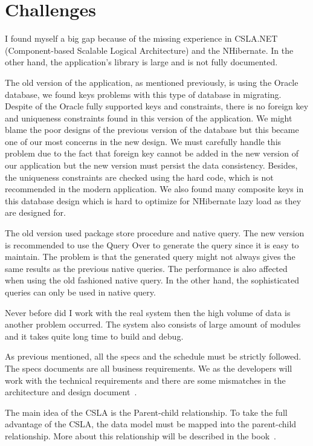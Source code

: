 \section{Challenges}\label{sec:challenges}
I found myself a big gap because of the missing experience in CSLA.NET (Component-based Scalable Logical Architecture) and the NHibernate. In the other hand, the application's library is large and is not fully documented. 
\par
The old version of the application, as mentioned previously, is using the Oracle database, we found keys problems with this type of database in migrating. Despite of the Oracle fully supported keys and constraints, there is no foreign key and uniqueness constraints found in this version of the application. We might blame the poor designs of the previous version of the database but this became one of our most concerns in the new design. We must carefully handle this problem due to the fact that foreign key cannot be added in the new version of our application but the new version must persist the data consistency. Besides, the uniqueness constraints are checked using the hard code, which is not recommended in the modern application. We also found many composite keys in this database design which is hard to optimize for NHibernate lazy load as they are designed for.
\par
The old version used package store procedure and native query. The new version is recommended to use the Query Over to generate the query since it is easy to maintain. The problem is that the generated query might not always gives the same results as the previous native queries. The performance is also affected when using the old fashioned native query. In the other hand, the sophisticated queries can only be used in native query. 
\par
Never before did I work with the real system then the high volume of data is another problem occurred. The system also consists of large amount of modules and it takes quite long time to build and debug.
\par
As previous mentioned, all the specs and the schedule must be strictly followed. The specs documents are all business requirements. We as the developers will work with the technical requirements and there are some mismatches in the architecture and design document~\cite{ADD}. 
\par
The main idea of the CSLA is the Parent-child relationship. To take the full advantage of the CSLA, the data model must be mapped into the parent-child relationship. More about this relationship will be described in the book~\cite{EBO, UCS}.
%